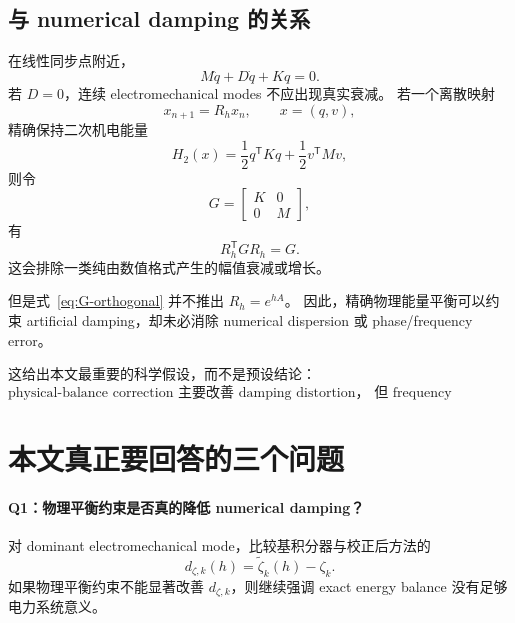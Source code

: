 \documentclass[UTF8,11pt,a4paper]{ctexart}
\newcommand{\T}{\mathsf{T}}
\begin{document}
\subsection{与 numerical damping 的关系}

在线性同步点附近，
\begin{equation}
  M\ddot q+D\dot q+Kq=0.
  \label{eq:linear-mech}
\end{equation}
若 \(D=0\)，连续 electromechanical modes 不应出现真实衰减。
若一个离散映射
\begin{equation}
  x_{n+1}=R_hx_n,
  \qquad
  x=(q,v),
\end{equation}
精确保持二次机电能量
\begin{equation}
  H_2(x)=\frac12 q^\T Kq+\frac12 v^\T Mv,
\end{equation}
则令
\begin{equation}
  G=
  \begin{bmatrix}
    K&0\\
    0&M
  \end{bmatrix},
\end{equation}
有
\begin{equation}
  R_h^\T G R_h=G.
  \label{eq:G-orthogonal}
\end{equation}
这会排除一类纯由数值格式产生的幅值衰减或增长。

但是式~\eqref{eq:G-orthogonal} 并不推出
\(
R_h=e^{hA}
\)。
因此，精确物理能量平衡可以约束 artificial damping，却未必消除 numerical
dispersion 或 phase/frequency error。

这给出本文最重要的科学假设，而不是预设结论：
\begin{equation}
  \boxed{
  \text{physical-balance correction 主要改善 damping distortion，
  但 frequency distortion 必须独立评估。}}
  \label{eq:key-hypothesis}
\end{equation}

\section{本文真正要回答的三个问题}

\paragraph{Q1：物理平衡约束是否真的降低 numerical damping？}
对 dominant electromechanical mode，比较基积分器与校正后方法的
\begin{equation}
  d_{\zeta,k}(h)
  =
  \widetilde\zeta_k(h)-\zeta_k.
\end{equation}
如果物理平衡约束不能显著改善 \(d_{\zeta,k}\)，则继续强调 exact energy balance
没有足够电力系统意义。
\end{document}
